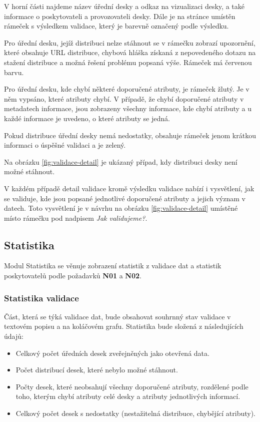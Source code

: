 V horní části najdeme název úřední desky a odkaz na vizualizaci desky, a také informace o poskytovateli a provozovateli desky. Dále je na stránce umístěn rámeček s výsledkem validace, který je barevně označený podle výsledku.

Pro úřední desku, jejíž distribuci nelze stáhnout se v rámečku zobrazí upozornění, které obsahuje URL distribuce, chybová hláška získaná z nepovedeného dotazu na stažení distribuce a možná řešení problému popsaná výše. Rámeček má červenou barvu.

Pro úřední desku, kde chybí některé doporučené atributy, je rámeček žlutý. Je v něm vypsáno, které atributy chybí. V případě, že chybí doporučené atributy v metadatech informace, jsou zobrazeny všechny informace, kde chybí atributy a u každé informace je uvedeno, o které atributy se jedná. 

Pokud distribuce úřední desky nemá nedostatky, obsahuje rámeček jenom krátkou informaci o úspěšné validaci a je zelený.

Na obrázku \ref{fig:validace-detail} je ukázaný případ, kdy distribuci desky není možné stáhnout.

V každém případě detail validace kromě výsledku validace nabízí i vysvětlení, jak se validuje, kde jsou popsané jednotlivé doporučené atributy a jejich význam v datech. Toto vysvětlení je v návrhu na obrázku  \ref{fig:validace-detail} umístěné místo rámečku pod nadpisem \textit{Jak validujeme?}.


\subsection{Statistika}

Modul Statistika se věnuje zobrazení statistik z validace dat a statistik poskytovatelů podle požadavků \textbf{N01} a \textbf{N02}. 

\subsubsection{Statistika validace}

Část, která se týká validace dat, bude obsahovat souhrnný stav validace v textovém popisu a na koláčovém grafu. Statistika bude složená z následujících údajů:
\begin{itemize}
    \item Celkový počet úředních desek zveřejněných jako otevřená data.
    \item Počet distribucí desek, které nebylo možné stáhnout.
    \item Počty desek, které neobsahují všechny doporučené atributy, rozdělené podle toho, kterým chybí atributy celé desky a atributy jednotlivých informací.
    \item Celkový počet desek s nedostatky (nestažitelná distribuce, chybějící atributy).
\end{itemize}

